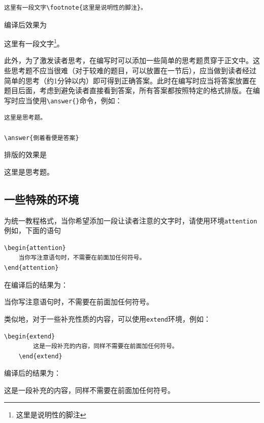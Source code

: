 \begin{lstlisting}[frame=line]
这里有一段文字\footnote{这里是说明性的脚注}。
\end{lstlisting}

编译后效果为

这里有一段文字\footnote{这里是说明性的脚注}。

此外，为了激发读者思考，在编写时可以添加一些简单的思考题贯穿于正文中。这些思考题不应当很难（对于较难的题目，可以放置在一节后），应当做到读者经过简单的思考（约1分钟以内）即可得到正确答案。此时在编写时应当将答案放置在题目后面，考虑到避免读者直接看到答案，所有答案都按照特定的格式排版。在编写时应当使用\verb|\answer{}|命令，例如：

\begin{lstlisting}[frame=line]
这里是思考题。

\answer{倒着看便是答案}
\end{lstlisting}

排版的效果是

这里是思考题。


\subsection{一些特殊的环境}\label{subsec:关于如何使用LaTeX编写模板-一些特殊的环境}

为统一教程格式，当你希望添加一段让读者注意的文字时，请使用环境\verb|attention|例如，下面的语句

\begin{lstlisting}[frame=line]
\begin{attention}
    当你写注意语句时，不需要在前面加任何符号。
\end{attention}
\end{lstlisting}
在编译后的结果为：

\begin{attention}
    当你写注意语句时，不需要在前面加任何符号。
\end{attention}

类似地，对于一些补充性质的内容，可以使用\verb|extend|环境，例如：
\begin{lstlisting}[frame=line]
    \begin{extend}
        这是一段补充的内容，同样不需要在前面加任何符号。
    \end{extend}
\end{lstlisting}

编译后的结果为：

\begin{extend}
    这是一段补充的内容，同样不需要在前面加任何符号。
\end{extend}

